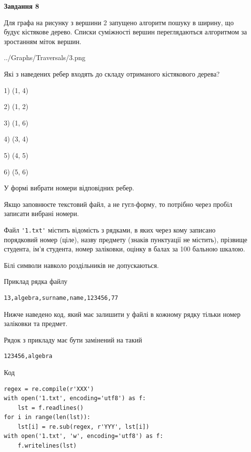\documentclass[12pt, ukrainian]{article}
\def\code#1{\Verb!#1!}
\begin{document}
{\begin {large}
{\begin {center}\textbf{Завдання 8}\end {center}}\par
Для графа на рисунку з вершини 2 запущено алгоритм пошуку в ширину, що будує кістякове дерево. Списки суміжності вершин переглядаються алгоритмом за зростанням міток вершин.\par
\begin{center}
	{../Graphs/Traversals/3.png}
\end{center}
\par Які з наведених ребер входять до складу отриманого кістякового дерева?\par
1) (1, 4)\par
2) (1, 2)\par
3) (1, 6)\par
4) (3, 4)\par
5) (4, 5)\par
6) (5, 6)\par
{\vskip 15pt} У формі вибрати номери відповідних ребер.


Якщо заповнюєте текстовий файл, а не гугл-форму, то потрібно через пробіл записа\-ти вибрані номери.\par
\newpage


Файл \code{'1.txt'} містить відомість з рядками, в яких через кому записано поряд\-ковий номер (ціле), назву предмету (знаків пунктуації не містить), прізвище студента, ім'я студента, номер заліковки, оцінку в балах за 100 бальною шкалою.

Білі символи навколо роздільників не допускаються.

Приклад рядка файлу



\begin{verbatim}
13,algebra,surname,name,123456,77
\end{verbatim}


Нижче наведено код, який має залишити у файлі в кожному рядку тільки номер заліковки та предмет.

Рядок з прикладу має бути замінений на такий



\begin{verbatim}
123456,algebra
\end{verbatim}




Код



\begin{verbatim}
regex = re.compile(r'XXX')
with open('1.txt', encoding='utf8') as f:
    lst = f.readlines()
for i in range(len(lst)):
    lst[i] = re.sub(regex, r'YYY', lst[i])
with open('1.txt', 'w', encoding='utf8') as f:
    f.writelines(lst)
\end{verbatim}







\end{large}}
\end{document}
